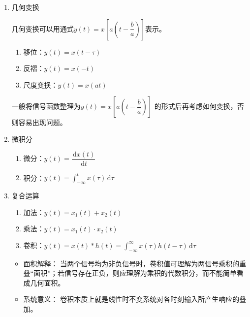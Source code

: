 \documentclass[UTF8,fontset=fandol,zihao=5]{ctexart}
\newcommand{\dd}{\,\mathrm{d}}
\begin{document}
\begin{enumerate}

  \item 几何变换
    
  几何变换可以用通式$\displaystyle y(t)=x\left [ a\left ( t - \dfrac{b}{a} \right ) \right ]$表示。
    
    \begin{enumerate}[label=(\arabic*)]
      \item 移位：$y(t)=x(t-\tau)$
      \item 反褶：$y(t)=x(-t)$
      \item 尺度变换：$y(t)=x(at)$
    \end{enumerate}
  
    \begin{methodbox}[【技巧】几何变换顺序]
      一般将信号函数整理为$\displaystyle y(t)=x\left [ a\left ( t - \dfrac{b}{a} \right ) \right ]$
      的形式后再考虑如何变换，否则容易出现问题。
    \end{methodbox}

  \item 微积分
  
    \begin{enumerate}[label=(\arabic*)]
      \item 微分：$y(t)=\dfrac{\dd x(t)}{\dd t}$
      \item 积分：$y(t)=\displaystyle \int_{-\infty}^t x(\tau) \dd \tau$
    \end{enumerate}

  \item 复合运算
    \begin{enumerate}[label=(\arabic*)]
      \item 加法：$y(t)=x_1(t) + x_2(t)$
      \item 乘法：$y(t)=x_1(t) \cdot x_2(t)$
      \item 卷积：$y(t)=x(t) * h(t) = \displaystyle \int_{-\infty}^{\infty} x(\tau) h(t-\tau) \dd \tau$
    \end{enumerate}
    \begin{methodbox}[卷积意义]
      \begin{itemize}
        \item 面积解释： 当两个信号均为非负信号时，卷积值可理解为两信号乘积的重叠“面积”；若信号存在正负，则应理解为乘积的代数积分，而不能简单看成几何面积。

        \item 系统意义： 卷积本质上就是线性时不变系统对各时刻输入所产生响应的叠加。
      \end{itemize}
    \end{methodbox}
    \begin{methodbox}[卷积性质]
      \begin{enumerate}[label=\arabic*.]


\end{enumerate}
\end{methodbox}
\end{enumerate}
\end{document}
